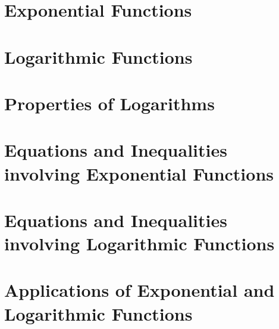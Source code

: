 \section{Exponential Functions}



\newpage

\section{Logarithmic Functions}



\newpage

\section{Properties of Logarithms}



\newpage

\section{Equations and Inequalities involving Exponential Functions}



\newpage

\section{Equations and Inequalities involving Logarithmic Functions}



\newpage

\section{Applications of Exponential and Logarithmic Functions}



